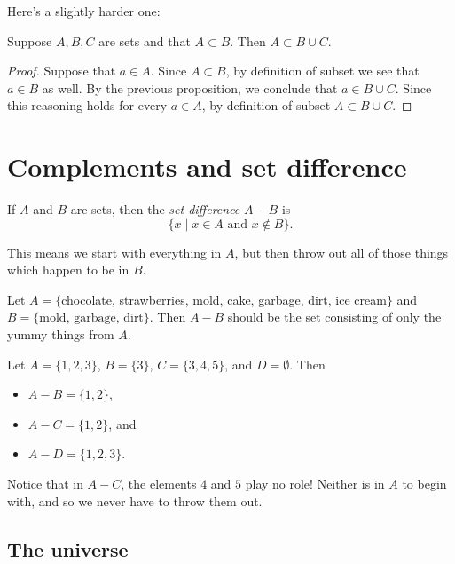 \documentclass{tufte-book}
\begin{document}
Here's a slightly harder one:
\begin{proposition}
  Suppose $A, B, C$ are sets and that $A \subset B$. Then $A \subset B \cup C$.
\end{proposition}

\begin{proof}
  Suppose that $a \in A$. Since $A \subset B$, by definition of subset we see that $a \in B$ as well. By the previous proposition, we conclude that $a \in B \cup C$. Since this reasoning holds for every $a \in A$, by definition of subset $A \subset B \cup C$.
\end{proof}




\section{Complements and set difference}
\label{sec:compl-set-diff}

\begin{definition}
  If $A$ and $B$ are sets, then the \emph{set difference} $A - B$ is 
  \[
  \{x \mid x \in A \text{ and } x \notin B\}.
  \]
\end{definition}
This means we start with everything in $A$, but then throw out all of those things which happen to be in $B$.

\begin{example}
  Let $A = \{$chocolate, strawberries, mold, cake, garbage, dirt, ice cream$\}$ and $B = \{\text{mold, garbage, dirt}\}$. Then $A - B$ should be the set consisting of only the yummy things from $A$.
\end{example}

\begin{example}
  Let $A = \{1, 2, 3\}$, $B = \{3\}$, $C = \{3, 4, 5\}$, and $D = \emptyset$. Then
  \begin{itemize}
      \item $A - B = \{1, 2\}$,
      \item $A - C = \{1, 2\}$, and
      \item $A - D = \{1, 2, 3\}$.
  \end{itemize}
  Notice that in $A - C$, the elements $4$ and $5$ play no role! Neither is in $A$ to begin with, and so we never have to throw them out.
\end{example}

\subsection{The universe}
\label{sec:universe}
\end{document}
